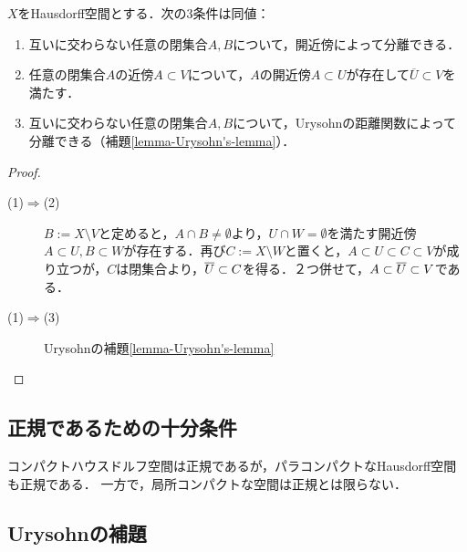 \documentclass[uplatex,dvipdfmx]{jsreport}
\begin{document}
\begin{proposition}[正規性の特徴付け]\label{prop-characterizatioin-of-normality}
    $X$をHausdorff空間とする．次の3条件は同値：
    \begin{enumerate}
        \item 互いに交わらない任意の閉集合$A,B$について，開近傍によって分離できる．
        \item 任意の閉集合$A$の近傍$A\subset V$について，$A$の開近傍$A\subset U$が存在して$\overline{U}\subset V$を満たす．
        \item 互いに交わらない任意の閉集合$A,B$について，Urysohnの距離関数によって分離できる（補題\ref{lemma-Urysohn's-lemma}）．
    \end{enumerate}
\end{proposition}
\begin{proof}\mbox{}
    \begin{description}
        \item[(1)$\Rightarrow$(2)] 
        $B:=X\setminus V$と定めると，$A\cap B\ne\emptyset$より，$U\cap W=\emptyset$を満たす開近傍$A\subset U,B\subset W$が存在する．再び$C:=X\setminus W$と置くと，$A\subset U\subset C\subset V$が成り立つが，$C$は閉集合より，$\overline{U}\subset C$を得る．２つ併せて，$A\subset\overline{U}\subset V$である．
        \item[(1)$\Rightarrow$(3)] Urysohnの補題\ref{lemma-Urysohn's-lemma}

    \end{description}
\end{proof}

\subsection{正規であるための十分条件}

\begin{proposition}
    コンパクトハウスドルフ空間は正規であるが，パラコンパクトなHausdorff空間も正規である．
    一方で，局所コンパクトな空間は正規とは限らない．
\end{proposition}

\subsection{Urysohnの補題}
\end{document}
